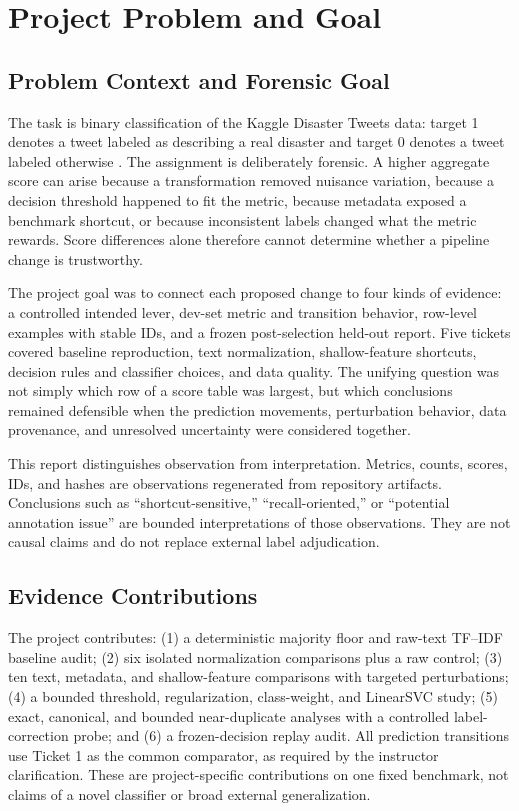\documentclass[conference]{IEEEtran}
\begin{document}
\section{Project Problem and Goal}

\subsection{Problem Context and Forensic Goal}

The task is binary classification of the Kaggle Disaster Tweets data: target 1 denotes a tweet labeled as describing a real disaster and target 0 denotes a tweet labeled otherwise \cite{kaggle-dataset,ucbrise-mirror,project-handout}. The assignment is deliberately forensic. A higher aggregate score can arise because a transformation removed nuisance variation, because a decision threshold happened to fit the metric, because metadata exposed a benchmark shortcut, or because inconsistent labels changed what the metric rewards. Score differences alone therefore cannot determine whether a pipeline change is trustworthy.

The project goal was to connect each proposed change to four kinds of evidence: a controlled intended lever, dev-set metric and transition behavior, row-level examples with stable IDs, and a frozen post-selection held-out report. Five tickets covered baseline reproduction, text normalization, shallow-feature shortcuts, decision rules and classifier choices, and data quality. The unifying question was not simply which row of a score table was largest, but which conclusions remained defensible when the prediction movements, perturbation behavior, data provenance, and unresolved uncertainty were considered together.

This report distinguishes observation from interpretation. Metrics, counts, scores, IDs, and hashes are observations regenerated from repository artifacts. Conclusions such as ``shortcut-sensitive,'' ``recall-oriented,'' or ``potential annotation issue'' are bounded interpretations of those observations. They are not causal claims and do not replace external label adjudication.

\subsection{Evidence Contributions}

The project contributes: (1) a deterministic majority floor and raw-text TF--IDF baseline audit; (2) six isolated normalization comparisons plus a raw control; (3) ten text, metadata, and shallow-feature comparisons with targeted perturbations; (4) a bounded threshold, regularization, class-weight, and LinearSVC study; (5) exact, canonical, and bounded near-duplicate analyses with a controlled label-correction probe; and (6) a frozen-decision replay audit. All prediction transitions use Ticket 1 as the common comparator, as required by the instructor clarification. These are project-specific contributions on one fixed benchmark, not claims of a novel classifier or broad external generalization.
\end{document}
